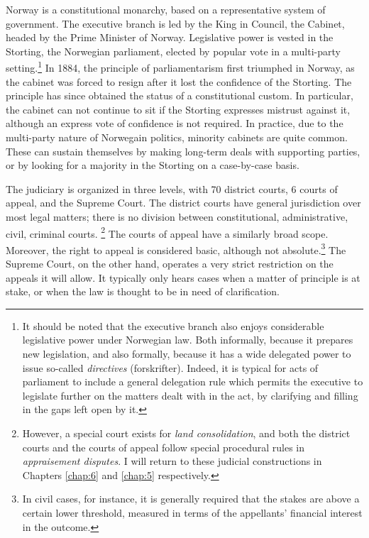 Norway is a constitutional monarchy, based on a representative system of government. The executive branch is led by the King in Council, the Cabinet, headed by the Prime Minister of Norway. Legislative power is vested in the Storting, the Norwegian parliament, elected by popular vote in a multi-party setting.\footnote{It should be noted that the executive branch also enjoys considerable legislative power under Norwegian law. Both informally, because it prepares new legislation, and also formally, because it has a wide delegated power to issue so-called {\it directives} (forskrifter). Indeed, it is typical for acts of parliament to include a general delegation rule which permits the executive to legislate further on the matters dealt with in the act, by clarifying and filling in the gaps left open by it.} In 1884, the principle of parliamentarism first triumphed in Norway, as the cabinet was forced to resign after it lost the confidence of the Storting. The principle has since obtained the status of a constitutional custom. In particular, the cabinet can not continue to sit if the Storting expresses mistrust against it, although an express vote of confidence is not required. In practice, due to the multi-party nature of Norwegain politics, minority cabinets are quite common. These can sustain themselves by making long-term deals with supporting parties, or by looking for a majority in the Storting on a case-by-case basis.

The judiciary is organized in three levels, with 70 district courts, 6 courts of appeal, and the Supreme Court. The district courts have general jurisdiction over most legal matters; there is no division between constitutional, administrative, civil, criminal courts. \footnote{However, a special court exists for {\it land consolidation}, and both the district courts and the courts of appeal follow special procedural rules in {\it appraisement disputes}. I will return to these judicial constructions in Chapters \ref{chap:6} and \ref{chap:5} respectively.} The courts of appeal have a similarly broad scope. Moreover, the right to appeal is considered basic, although not absolute.\footnote{In civil cases, for instance, it is generally required that the stakes are above a certain lower threshold, measured in terms of the appellants' financial interest in the outcome.}  The Supreme Court, on the other hand, operates a very strict restriction on the appeals it will allow. It typically only hears cases when a matter of principle is at stake, or when the law is thought to be in need of clarification.

